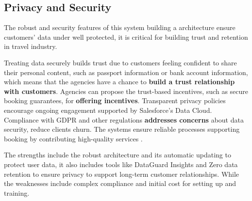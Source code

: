 \subsection{Privacy and Security}
The robust and security features of this system building a architecture ensure customers' data under well protected, it is critical for building trust and retention in travel industry.

Treating data securely builds trust due to customers feeling confident to share their personal content, such as passport information or bank account information, which means that the agencies have a chance to \textbf{build a trust relationship with customers}. Agencies can propose the trust-based incentives, such as secure booking guarantees, for \textbf{offering incentives}. Transparent privacy policies encourage ongoing engagement supported by Salesforce's Data Cloud. Compliance with GDPR and other regulations \textbf{addresses concerns} about data security, reduce clients churn. The systems ensure reliable processes supporting booking by contributing high-quality services \cite{SalesforceSecurity2025}. 

The strengths include the robust architecture and its automatic updating to protect user data, it also includes tools like DataGuard Insights and Zero data retention to ensure privacy to support long-term customer relationships. While the weaknesses include complex compliance and initial cost for setting up and training.